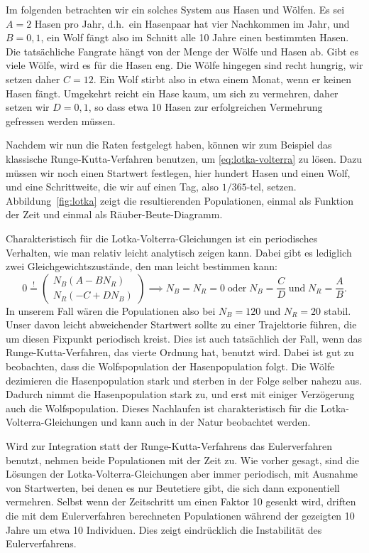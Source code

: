 Im folgenden betrachten wir ein solches System aus Hasen und
Wölfen. Es sei $A=2$ Hasen pro Jahr, d.h.\ ein Hasenpaar hat vier
Nachkommen im Jahr, und $B=0,1$, ein Wolf fängt also im Schnitt alle
10 Jahre einen bestimmten Hasen. Die tatsächliche Fangrate hängt von
der Menge der Wölfe und Hasen ab. Gibt es viele Wölfe, wird es für die
Hasen eng. Die Wölfe hingegen sind recht hungrig, wir setzen daher
$C=12$. Ein Wolf stirbt also in etwa einem Monat, wenn er keinen Hasen
fängt. Umgekehrt reicht ein Hase kaum, um sich zu vermehren, daher
setzen wir $D=0,1$, so dass etwa 10 Hasen zur erfolgreichen Vermehrung
gefressen werden müssen.

Nachdem wir nun die Raten festgelegt haben, können wir zum Beispiel
das klassische Runge-Kutta-Verfahren benutzen, um
\eqref{eq:lotka-volterra} zu lösen. Dazu müssen wir noch einen
Startwert festlegen, hier hundert Hasen und einen Wolf, und eine
Schrittweite, die wir auf einen Tag, also $1/365$-tel,
setzen. Abbildung~\ref{fig:lotka} zeigt die resultierenden
Populationen, einmal als Funktion der Zeit und einmal als
Räuber-Beute-Diagramm.

Charakteristisch für die Lotka-Volterra-Gleichungen ist ein
periodisches Verhalten, wie man relativ leicht analytisch zeigen
kann. Dabei gibt es lediglich zwei Gleichgewichtszustände, den man
leicht bestimmen kann:
\begin{equation}
  0 \stackrel{!}{=}
  \begin{pmatrix}
    N_B (A - B N_R)\\
    N_R (-C + D N_B)
  \end{pmatrix}
  \implies N_B=N_R=0\;
  \text{oder}\;N_B=\frac{C}{D}\;\text{und}\;N_R=\frac{A}{B}.
\end{equation}
In unserem Fall wären die Populationen also bei $N_B=120$ und $N_R=20$
stabil. Unser davon leicht abweichender Startwert sollte zu einer
Trajektorie führen, die um diesen Fixpunkt periodisch kreist. Dies ist
auch tatsächlich der Fall, wenn das Runge-Kutta-Verfahren, das vierte
Ordnung hat, benutzt wird. Dabei ist gut zu beobachten, dass die
Wolfspopulation der Hasenpopulation folgt. Die Wölfe dezimieren die
Hasenpopulation stark und sterben in der Folge selber nahezu
aus. Dadurch nimmt die Hasenpopulation stark zu, und erst mit einiger
Verzögerung auch die Wolfspopulation. Dieses Nachlaufen ist
charakteristisch für die Lotka-Volterra-Gleichungen und kann auch in
der Natur beobachtet werden.

Wird zur Integration statt der Runge-Kutta-Verfahrens das
Eulerverfahren benutzt, nehmen beide Populationen mit der Zeit zu. Wie
vorher gesagt, sind die Lösungen der Lotka-Volterra-Gleichungen aber
immer periodisch, mit Ausnahme von Startwerten, bei denen es nur
Beutetiere gibt, die sich dann exponentiell vermehren. Selbst wenn der
Zeitschritt um einen Faktor 10 gesenkt wird, driften die mit dem
Eulerverfahren berechneten Populationen während der gezeigten 10 Jahre
um etwa 10 Individuen. Dies zeigt eindrücklich die Instabilität des
Eulerverfahrens.

